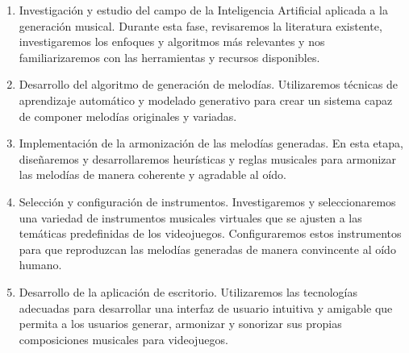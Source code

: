 \begin{enumerate}
    \item Investigación y estudio del campo de la Inteligencia Artificial aplicada a la generación musical. Durante esta fase, revisaremos la literatura existente, investigaremos los enfoques y algoritmos más relevantes y nos familiarizaremos con las herramientas y recursos disponibles.
    \item Desarrollo del algoritmo de generación de melodías. Utilizaremos técnicas de aprendizaje automático y modelado generativo para crear un sistema capaz de componer melodías originales y variadas.
    \item Implementación de la armonización de las melodías generadas. En esta etapa, diseñaremos y desarrollaremos heurísticas y reglas musicales para armonizar las melodías de manera coherente y agradable al oído.
    \item Selección y configuración de instrumentos. Investigaremos y seleccionaremos una variedad de instrumentos musicales virtuales que se ajusten a las temáticas predefinidas de los videojuegos. Configuraremos estos instrumentos para que reproduzcan las melodías generadas de manera convincente al oído humano.
    \item Desarrollo de la aplicación de escritorio. Utilizaremos las tecnologías adecuadas para desarrollar una interfaz de usuario intuitiva y amigable que permita a los usuarios generar, armonizar y sonorizar sus propias composiciones musicales para videojuegos.
\end{enumerate}







